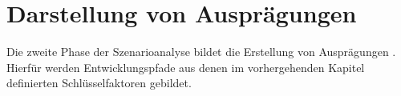\section{Darstellung von Ausprägungen}
\label{manifestations}

Die zweite Phase der Szenarioanalyse bildet die Erstellung von Ausprägungen \cite{spath}. Hierfür werden Entwicklungspfade aus denen im vorhergehenden Kapitel definierten Schlüsselfaktoren gebildet. 